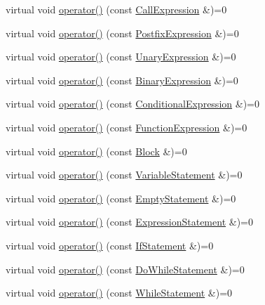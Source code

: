 \begin{DoxyCompactItemize}
\item 
virtual void \hyperlink{struct_visitor_aa6152c6f355690fd1c4db37fff303614}{operator()} (const \hyperlink{struct_call_expression}{Call\+Expression} \&)=0
\item 
virtual void \hyperlink{struct_visitor_acd630c29940c6785726ce51c7db0aab9}{operator()} (const \hyperlink{struct_postfix_expression}{Postfix\+Expression} \&)=0
\item 
virtual void \hyperlink{struct_visitor_ad2e06814dadca4469f4036ba9a00afd7}{operator()} (const \hyperlink{struct_unary_expression}{Unary\+Expression} \&)=0
\item 
virtual void \hyperlink{struct_visitor_a6132b5969ec220e7c98af3a957f48a0e}{operator()} (const \hyperlink{struct_binary_expression}{Binary\+Expression} \&)=0
\item 
virtual void \hyperlink{struct_visitor_a132fc5e3ff45efb2869272fbe5d5f815}{operator()} (const \hyperlink{struct_conditional_expression}{Conditional\+Expression} \&)=0
\item 
virtual void \hyperlink{struct_visitor_a3f6eb67942d7e2c83a761de2bd66a60a}{operator()} (const \hyperlink{struct_function_expression}{Function\+Expression} \&)=0
\item 
virtual void \hyperlink{struct_visitor_a3a26b45c1ab418661f992d97ed9ec9f0}{operator()} (const \hyperlink{struct_block}{Block} \&)=0
\item 
virtual void \hyperlink{struct_visitor_accbed2e228126d93b162df7bb44bb3c8}{operator()} (const \hyperlink{struct_variable_statement}{Variable\+Statement} \&)=0
\item 
virtual void \hyperlink{struct_visitor_a67719a8d9005a86141e4cb9226c11ca4}{operator()} (const \hyperlink{struct_empty_statement}{Empty\+Statement} \&)=0
\item 
virtual void \hyperlink{struct_visitor_a319554fbb3f24e664a86ef7839201040}{operator()} (const \hyperlink{struct_expression_statement}{Expression\+Statement} \&)=0
\item 
virtual void \hyperlink{struct_visitor_a9d30bc5ad73a274f7533df4b5a65ae41}{operator()} (const \hyperlink{struct_if_statement}{If\+Statement} \&)=0
\item 
virtual void \hyperlink{struct_visitor_a077a0025430c4b35d310bdfcbe1b180a}{operator()} (const \hyperlink{struct_do_while_statement}{Do\+While\+Statement} \&)=0
\item 
virtual void \hyperlink{struct_visitor_a4faef50c61a3c1246589390d925c2f53}{operator()} (const \hyperlink{struct_while_statement}{While\+Statement} \&)=0

\end{DoxyCompactItemize}
